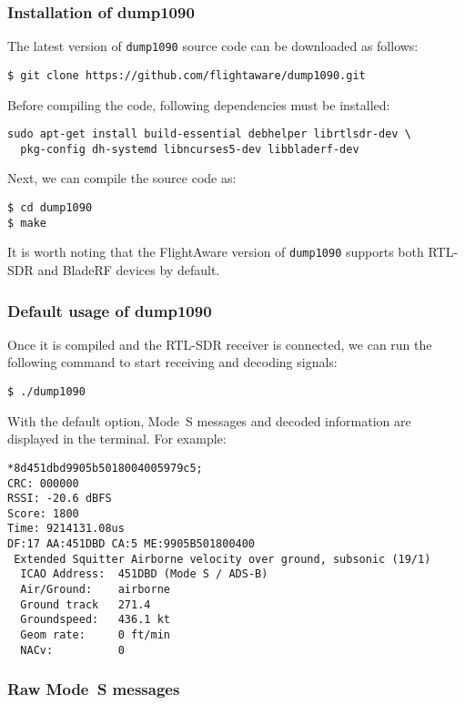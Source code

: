 \subsubsection{Installation of dump1090}
The latest version of \texttt{dump1090} source code can be downloaded as follows:

\begin{verbatim}
$ git clone https://github.com/flightaware/dump1090.git
\end{verbatim}

Before compiling the code, following dependencies must be installed:

\begin{verbatim}
sudo apt-get install build-essential debhelper librtlsdr-dev \
  pkg-config dh-systemd libncurses5-dev libbladerf-dev
\end{verbatim}

Next, we can compile the source code as:

\begin{verbatim}
$ cd dump1090
$ make
\end{verbatim}

It is worth noting that the FlightAware version of \texttt{dump1090} supports both RTL-SDR and BladeRF devices by default.

\subsubsection{Default usage of dump1090}

Once it is compiled and the RTL-SDR receiver is connected, we can run the following command to start receiving and decoding signals:

\begin{verbatim}
$ ./dump1090
\end{verbatim}

With the default option, Mode~S messages and decoded information are displayed in the terminal. For example:

\begin{verbatim}
*8d451dbd9905b5018004005979c5;
CRC: 000000
RSSI: -20.6 dBFS
Score: 1800
Time: 9214131.08us
DF:17 AA:451DBD CA:5 ME:9905B501800400
 Extended Squitter Airborne velocity over ground, subsonic (19/1)
  ICAO Address:  451DBD (Mode S / ADS-B)
  Air/Ground:    airborne
  Ground track   271.4
  Groundspeed:   436.1 kt
  Geom rate:     0 ft/min
  NACv:          0
\end{verbatim}

\subsubsection{Raw Mode~S messages}

